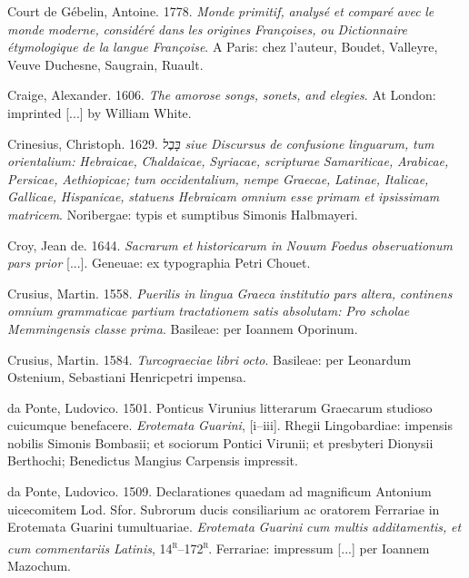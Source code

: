\documentclass[output=paper]{langsci/langscibook}
\begin{document}
Court de Gébelin, Antoine. 1778. \textit{Monde} \textit{primitif,} \textit{analysé} \textit{et} \textit{comparé} \textit{avec} \textit{le} \textit{monde} \textit{moderne,} \textit{considéré} \textit{dans} \textit{les} \textit{origines} \textit{Françoises,} \textit{ou} \textit{Dictionnaire} \textit{étymologique} \textit{de} \textit{la} \textit{langue} \textit{Françoise}. A Paris: chez l’auteur, Boudet, Valleyre, Veuve Duchesne, Saugrain, Ruault.

Craige, Alexander. 1606. \textit{The} \textit{amorose} \textit{songs,} \textit{sonets,} \textit{and} \textit{elegies}. At London: imprinted [...] by William White.

Crinesius, Christoph. 1629. \textit{בָּבֶל} \textit{siue} \textit{Discursus} \textit{de} \textit{confusione} \textit{linguarum,} \textit{tum} \textit{orientalium:} \textit{Hebraicae,} \textit{Chaldaicae,} \textit{Syriacae,} \textit{scripturae} \textit{Samariticae,} \textit{Arabicae,} \textit{Persicae,} \textit{Aethiopicae;} \textit{tum} \textit{occidentalium,} \textit{nempe} \textit{Graecae,} \textit{Latinae,} \textit{Italicae,} \textit{Gallicae,} \textit{Hispanicae,} \textit{statuens} \textit{Hebraicam} \textit{omnium} \textit{esse} \textit{primam} \textit{et} \textit{ipsissimam} \textit{matricem}. Noribergae: typis et sumptibus Simonis Halbmayeri.

Croy, Jean de. 1644. \textit{Sacrarum} \textit{et} \textit{historicarum} \textit{in} \textit{Nouum} \textit{Foedus} \textit{obseruationum} \textit{pars} \textit{prior} [...]. Geneuae: ex typographia Petri Chouet.

Crusius, Martin. 1558. \textit{Puerilis} \textit{in} \textit{lingua} \textit{Graeca} \textit{institutio} \textit{pars} \textit{altera,} \textit{continens} \textit{omnium} \textit{grammaticae} \textit{partium} \textit{tractationem} \textit{satis} \textit{absolutam:} \textit{Pro} \textit{scholae} \textit{Memmingensis} \textit{classe} \textit{prima}. Basileae: per Ioannem Oporinum.

Crusius, Martin. 1584. \textit{Turcograeciae} \textit{libri} \textit{octo}. Basileae: per Leonardum Ostenium, Sebastiani Henricpetri impensa.

da Ponte, Ludovico. 1501. Ponticus Virunius litterarum Graecarum studioso cuicumque benefacere. \textit{Erotemata} \textit{Guarini}, [i–iii]. Rhegii Lingobardiae: impensis nobilis Simonis Bombasii; et sociorum Pontici Virunii; et presbyteri Dionysii Berthochi; Benedictus Mangius Carpensis impressit.

da Ponte, Ludovico. 1509. Declarationes quaedam ad magnificum Antonium uicecomitem Lod. Sfor. Subrorum ducis consiliarium ac oratorem Ferrariae in Erotemata Guarini tumultuariae. \textit{Erotemata} \textit{Guarini} \textit{cum} \textit{multis} \textit{additamentis,} \textit{et} \textit{cum} \textit{commentariis} \textit{Latinis}, 14\textsc{\textsuperscript{r}}–172\textsc{\textsuperscript{r}}. Ferrariae: impressum [...] per Ioannem Mazochum.
\end{document}

